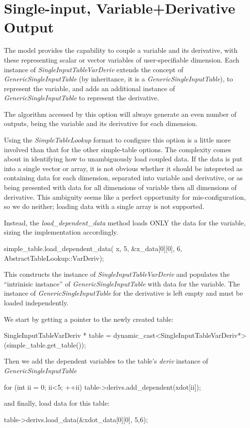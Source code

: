 \documentclass[11pt,fleqn]{report}
\begin{document}
\section{Single-input, Variable+Derivative Output}
The model provides the capability to couple a variable and its derivative, with
these representing scalar or vector variables of user-specifiable dimension.
Each instance of \textit{SingleInputTableVarDeriv} extends the concept of
\textit{GenericSingleInputTable} (by inheritance, it is a
\textit{GenericSingleInputTable}), to represent the variable, and adds an
additional instance of \textit{GenericSingleInputTable} to represent the
derivative.

The algorithm accessed by this option will always generate an even number of
outputs, being the variable and its derivative for each dimension.

Using the \textit{SimpleTableLookup} format to configure this option is a
little more involved than that for the other simple-table options.
The complexity comes about in identifying how to unambiguously
load coupled data. If the data is put into a single vector or array, it is not
obvious whether it should be intepreted as containing data for each dimension,
separated into variable and derivative, or as being presented with data for
all dimensions of variable then all dimensions of derivative.
This ambiguity seems like a perfect opportunity for mis-configuration, so we
do neither; loading data with a single array is not supported.

Instead, the \textit{load\_dependent\_data} method loads ONLY the data for the
variable, sizing the implementation accordingly.
\begin{code}
simple_table.load_dependent_data( x,
                                  5,
                                  &x_data[0][0],
                                  6,
                                  AbstractTableLookup::VarDeriv);
\end{code}
This constructs the instance of \textit{SingleInputTableVarDeriv} and populates
the ``intrinisic instance'' of \textit{GenericSingleInputTable} with data for the
variable. The instance of \textit{GenericSingleInputTable} for the derivative
is left empty and must be loaded independently.

We start by getting a pointer to the newly created table:
\begin{code}
SingleInputTableVarDeriv * table =
  dynamic_cast<SingleInputTableVarDeriv*>(simple_table.get_table());
\end{code}
Then we add the dependent variables to the table's \textit{deriv} instance of
\textit{GenericSingleInputTable}
\begin{code}
for (int ii = 0; ii<5; ++ii) {
  table->derivs.add_dependent(xdot[ii]);
}
\end{code}
and finally, load data for this table:
\begin{code}
table->derivs.load_data(&xdot_data[0][0], {5,6});
\end{code}
\begin{code}
\end{code}
\end{document}
